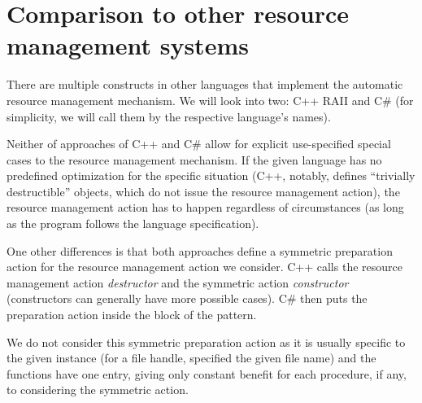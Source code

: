 \section{Comparison to other resource management systems}
\label{sec:OtherRAII}

There are multiple constructs in other languages that implement the automatic resource management mechanism. We will look into two: C++ RAII and C\#  (for simplicity, we will call them by the respective language's names).

Neither of approaches of C++ and C\# allow for explicit use-specified special cases to the resource management mechanism. If the given language has no predefined optimization for the specific situation (C++, notably, defines ``trivially destructible'' objects, which do not issue the resource management action), the resource management action has to happen regardless of circumstances (as long as the program follows the language specification).

One other differences is that both approaches define a symmetric preparation action for the resource management action we consider. C++ calls the resource management action \emph{destructor} and the symmetric action \emph{constructor} (constructors can generally have more possible cases). C\# then puts the preparation action inside the  block of the pattern.

We do not consider this symmetric preparation action as it is usually specific to the given instance (for a file handle, specified the given file name) and the functions have one entry, giving only constant benefit for each procedure, if any, to considering the symmetric action.

